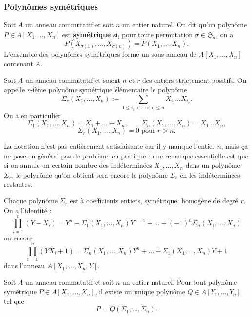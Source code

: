\documentclass[]{report}
\begin{document}
\subsubsection{Polynômes symétriques}

Soit $A$ un anneau commutatif et soit $n$ un entier naturel. On dit qu'un polynôme $P \in A[X_1, \dots, X_n]$ est \textbf{symétrique} si, pour toute permutation $\sigma \in \mathfrak{S}_n$, on a
\[P(X_{\sigma(1)}, \dots, X_{\sigma(n)}) = P(X_1, \dots, X_n).\]
L'ensemble des polynômes symétriques forme un sous-anneau de $A[X_1, \dots, X_n]$ contenant $A$.

\begin{df}{}{}
    Soit $A$ un anneau commutatif et soient $n$ et $r$ des entiers strictement positifs. On appelle $r$-ième polynôme symétrique élémentaire le polynôme
    \[\Sigma_r(X_1, \dots, X_n) := \sum_{1 \le i_1 < \dots < i_r \le n} X_{i_1} \dots X_{i_r}.\]
    On a en particulier
    \[\Sigma_1(X_1, \dots, X_n) = X_1 + \dots + X_n, \qquad \Sigma_n(X_1, \dots, X_n) = X_1 \dots X_n,\]
    \[\Sigma_r(X_1, \dots, X_n) = 0 \text{ pour } r > n.\]
\end{df}

\begin{re}{}{}
    La notation n'est pas entièrement satisfaisante car il y manque l'entier $n$, mais ça ne pose en général pas de problème en pratique : une remarque essentielle est que si on annule un certain nombre des indéterminées $X_1, \ldots, X_n$ dans un polynôme $\Sigma_r$, le polynôme qu'on obtient sera encore le polynôme $\Sigma_r$ en les indéterminées restantes.

    Chaque polynôme $\Sigma_r$ est à coefficients entiers, symétrique, homogène de degré $r$. On a l'identité :
    \[\prod_{i = 1}^{n}(Y - X_i) = Y^n - \Sigma_1(X_1, \dots, X_n) Y^{n-1} + \dots + (-1)^n \Sigma_n(X_1, \dots, X_n) \tag{1.4}\]
    ou encore
    \[\prod_{i = 1}^{n}(Y X_i + 1) = \Sigma_n(X_1, \dots, X_n) Y^n + \dots + \Sigma_1(X_1, \dots, X_n) Y + 1\]
    dans l'anneau $A[X_1, \ldots, X_n, Y]$.
\end{re}

\begin{tm}{}{}
    Soit $A$ un anneau commutatif et soit $n$ un entier naturel. Pour tout polynôme symétrique $P \in A[X_1, \ldots, X_n]$, il existe un unique polynôme $Q \in A[Y_1, \ldots, Y_n]$ tel que
    \[P = Q(\Sigma_1, \dots, \Sigma_n). \tag{1.5}\]
\end{tm}
\end{document}
